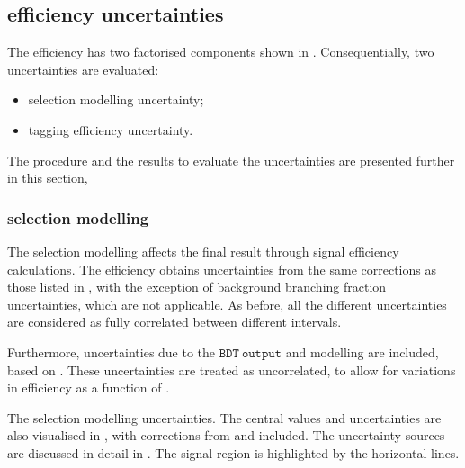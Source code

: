 \subsection{\texorpdfstring{\BtoXsgamma}{B->Xs gamma} efficiency uncertainties}\label{sec:signal_selection_uncertainties}

The \BtoXsgamma efficiency has two factorised components shown in .
Consequentially, two uncertainties are evaluated:
\begin{itemize}
    \item \BtoXsgamma selection modelling uncertainty;
    \item \BtoXsgamma tagging efficiency uncertainty.
\end{itemize}

The procedure and the results to evaluate the uncertainties are presented further in this section,

\subsubsection{\texorpdfstring{\BtoXsgamma}{B->Xs gamma} selection modelling}

The \BtoXsgamma selection modelling affects the final result through signal efficiency calculations.
The efficiency obtains uncertainties from the same corrections as those listed in , 
with the exception of background branching fraction uncertainties, which are not applicable.
As before, all the different uncertainties are considered as fully correlated between different \EB intervals.

Furthermore, uncertainties due to the $\mathtt{BDT~output}$ and \ZMVA modelling are included, based on .
These uncertainties are treated as uncorrelated, to allow for variations in efficiency as a function of \EB.

\begin{table}[htbp!]
    \centering
    \caption{\label{tab:signal_selection_uncertainties}
    The \BtoXsgamma selection modelling uncertainties.
    The central values and uncertainties are also visualised in ,
    with corrections from  and  included.
    The uncertainty sources are discussed in detail in .
    The signal region is highlighted by the horizontal lines.
    }
    
\end{table}

